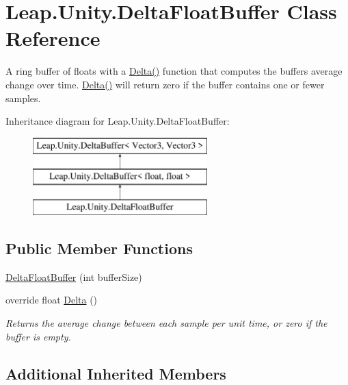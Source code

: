 \hypertarget{class_leap_1_1_unity_1_1_delta_float_buffer}{}\section{Leap.\+Unity.\+Delta\+Float\+Buffer Class Reference}
\label{class_leap_1_1_unity_1_1_delta_float_buffer}


A ring buffer of floats with a \mbox{\hyperlink{class_leap_1_1_unity_1_1_delta_float_buffer_afc1e79b97babd5397852a33e3aa425a7}{Delta()}} function that computes the buffer\textquotesingle{}s average change over time. \mbox{\hyperlink{class_leap_1_1_unity_1_1_delta_float_buffer_afc1e79b97babd5397852a33e3aa425a7}{Delta()}} will return zero if the buffer contains one or fewer samples.  


Inheritance diagram for Leap.\+Unity.\+Delta\+Float\+Buffer\+:\begin{figure}[H]
\begin{center}
\leavevmode
\includegraphics[height=3.000000cm]{class_leap_1_1_unity_1_1_delta_float_buffer}
\end{center}
\end{figure}
\subsection*{Public Member Functions}
\begin{DoxyCompactItemize}
\item 
\mbox{\hyperlink{class_leap_1_1_unity_1_1_delta_float_buffer_a496dfd0f1489077ae0b34730577c7024}{Delta\+Float\+Buffer}} (int buffer\+Size)
\item 
override float \mbox{\hyperlink{class_leap_1_1_unity_1_1_delta_float_buffer_afc1e79b97babd5397852a33e3aa425a7}{Delta}} ()
\begin{DoxyCompactList}\small\item\em Returns the average change between each sample per unit time, or zero if the buffer is empty. \end{DoxyCompactList}\end{DoxyCompactItemize}
\subsection*{Additional Inherited Members}


